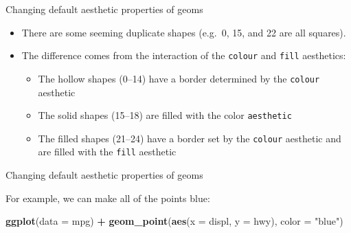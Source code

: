\documentclass[ignorenonframetext,]{beamer}
\newenvironment{Shaded}{\begin{snugshade}}{\end{snugshade}}
\newcommand{\DataTypeTok}[1]{\textcolor[rgb]{0.13,0.29,0.53}{#1}}
\newcommand{\KeywordTok}[1]{\textcolor[rgb]{0.13,0.29,0.53}{\textbf{#1}}}
\newcommand{\NormalTok}[1]{#1}
\newcommand{\OperatorTok}[1]{\textcolor[rgb]{0.81,0.36,0.00}{\textbf{#1}}}
\newcommand{\StringTok}[1]{\textcolor[rgb]{0.31,0.60,0.02}{#1}}
\begin{document}
\begin{frame}[fragile]{Changing default aesthetic properties of geoms}
\protect\hypertarget{changing-default-aesthetic-properties-of-geoms-1}{}

\begin{itemize}
\item
  There are some seeming duplicate shapes (e.g.~0, 15, and 22 are all
  squares).
\item
  The difference comes from the interaction of the \texttt{colour} and
  \texttt{fill} aesthetics:

  \begin{itemize}
  \item
    The hollow shapes (0--14) have a border determined by the
    \texttt{colour} aesthetic
  \item
    The solid shapes (15--18) are filled with the color
    \texttt{aesthetic}
  \item
    The filled shapes (21--24) have a border set by the \texttt{colour}
    aesthetic and are filled with the \texttt{fill} aesthetic
  \end{itemize}
\end{itemize}

\end{frame}

\begin{frame}[fragile]{Changing default aesthetic properties of geoms}
\protect\hypertarget{changing-default-aesthetic-properties-of-geoms-2}{}

For example, we can make all of the points blue:

\begin{Shaded}
\begin{Highlighting}[]
\KeywordTok{ggplot}\NormalTok{(}\DataTypeTok{data =}\NormalTok{ mpg) }\OperatorTok{+}
\StringTok{  }\KeywordTok{geom_point}\NormalTok{(}\KeywordTok{aes}\NormalTok{(}\DataTypeTok{x =}\NormalTok{ displ, }\DataTypeTok{y =}\NormalTok{ hwy), }
    \DataTypeTok{color =} \StringTok{"blue"}\NormalTok{)}
\end{Highlighting}
\end{Shaded}

\end{frame}
\end{document}
